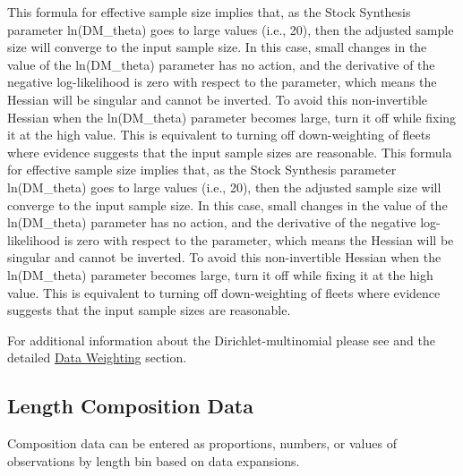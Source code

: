 This formula for effective sample size implies that, as the Stock Synthesis parameter ln(DM\_theta) goes to large values (i.e., 20), then the adjusted sample size will converge to the input sample size. In this case, small changes in the value of the ln(DM\_theta) parameter has no action, and the derivative of the negative log-likelihood is zero with respect to the parameter, which means the Hessian will be singular and cannot be inverted. To avoid this non-invertible Hessian when the ln(DM\_theta) parameter becomes large, turn it off while fixing it at the high value. This is equivalent to turning off down-weighting of fleets where evidence suggests that the input sample sizes are reasonable.
This formula for effective sample size implies that, as the Stock Synthesis parameter ln(DM\_theta) goes to large values (i.e., 20), then the adjusted sample size will converge to the input sample size. In this case, small changes in the value of the ln(DM\_theta) parameter has no action, and the derivative of the negative log-likelihood is zero with respect to the parameter, which means the Hessian will be singular and cannot be inverted. To avoid this non-invertible Hessian when the ln(DM\_theta) parameter becomes large, turn it off while fixing it at the high value. This is equivalent to turning off down-weighting of fleets where evidence suggests that the input sample sizes are reasonable.
	
For additional information about the Dirichlet-multinomial please see \citet{thorson-model-based-2017} and the detailed \hyperlink{DataWeight}{Data Weighting} section.

\hypertarget{CompTiming}{}
\subsection{Length Composition Data}
Composition data can be entered as proportions, numbers, or values of observations by length bin based on data expansions.  

